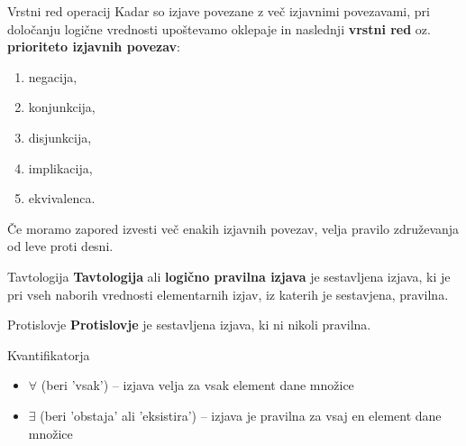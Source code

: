         \begin{frame}
            \begin{block}{Vrstni red operacij}
                Kadar so izjave povezane z več izjavnimi povezavami, pri določanju logične 
                vrednosti upoštevamo oklepaje in naslednji \textbf{vrstni red} oz.~ 
                \textbf{prioriteto izjavnih povezav}:
                \begin{enumerate}
                    \item negacija,
                    \item konjunkcija,
                    \item disjunkcija,
                    \item implikacija,
                    \item ekvivalenca.
                \end{enumerate}
            \end{block}
            \begin{block}{}
                Če moramo zapored izvesti več enakih izjavnih povezav, velja pravilo združevanja 
                od leve proti desni.
            \end{block}
        \end{frame}

        \begin{frame}
            \begin{alertblock}{Tavtologija}
                \textbf{Tavtologija} ali \textbf{logično pravilna izjava} je sestavljena izjava, 
                ki je pri vseh naborih vrednosti elementarnih izjav, iz katerih je sestavjena, pravilna.
            \end{alertblock}

            \begin{alertblock}{Protislovje}
                \textbf{Protislovje} je sestavljena izjava, ki ni nikoli pravilna.
            \end{alertblock}

            \begin{block}{Kvantifikatorja}
                \begin{itemize}
                    \item $\forall$ (beri 'vsak') -- izjava velja za vsak element dane množice
                    \item $\exists$ (beri 'obstaja' ali 'eksistira') -- izjava je pravilna za vsaj en element dane množice
                \end{itemize}
            \end{block}

        \end{frame}

